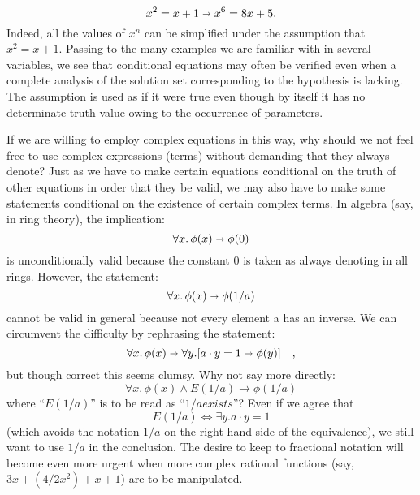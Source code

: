 $$
x^2 = x + 1 \shortrightarrow x^6 = 8x + 5.
$$
Indeed, all the values of $x^n$ can be simplified under the assumption that $x^2 =
x + 1$. Passing to the many examples we are familiar with in several variables,
we see that conditional equations may often be verified even when a complete analysis
of the solution set corresponding to the hypothesis is lacking. The assumption
is used as if it were true even though by itself it has no determinate truth value 
owing to the occurrence of parameters.

If we are willing to employ complex equations in this way, why should we not feel 
free to use complex expressions (terms) without demanding that they always denote? Just as we have to make certain equations conditional on the truth of
other equations in order that they be valid, we may also have to make some 
statements conditional on the existence of certain complex terms. In algebra (say, in ring theory), the implication:
$$
\forall x.\, \phi(x) \shortrightarrow \phi(0)
$$
is unconditionally valid because the constant 0 is taken as always denoting in
all rings. However, the statement:
$$
\forall x.\, \phi(x) \shortrightarrow \phi(1/a)
$$
cannot be valid in general because not every element a has an inverse. We can circumvent the difficulty by rephrasing the statement:
$$
\forall x.\, \phi(x) \shortrightarrow \forall y. [ a \cdot y = 1 \shortrightarrow \phi(y) ] \quad,
$$
but though correct this seems clumsy. Why not say more directly:
$$
\forall x.\, \phi(x) \land E(1/a) \to \phi(1/a)
$$
where ``$E(1/a)$'' is to be read as ``$1/a exists$''? Even if we agree that
$$
E(1/a) \iff \exists y. a \cdot y = 1
$$
(which avoids the notation $1/a$ on the right-hand side of the equivalence), we still want to use $1/a$ in the conclusion. 
The desire to keep to fractional notation will become even more urgent when more complex rational functions 
(say, $3x + (4 / 2x^2) + x + 1$) are to be manipulated.
\begin{thebibliography}{86}


\end{thebibliography}
